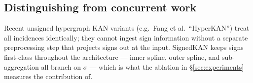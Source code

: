 \subsection{Distinguishing from concurrent work}

Recent unsigned hypergraph KAN variants (e.g.\ Fang et al.\
``HyperKAN'') treat all incidences identically; they cannot ingest
sign information without a separate preprocessing step that projects
signs out at the input. SignedKAN keeps signs first-class throughout
the architecture --- inner spline, outer spline, and sub-aggregation
all branch on $\sigma$ --- which is what the ablation in
\S\ref{sec:experiments} measures the contribution of.
